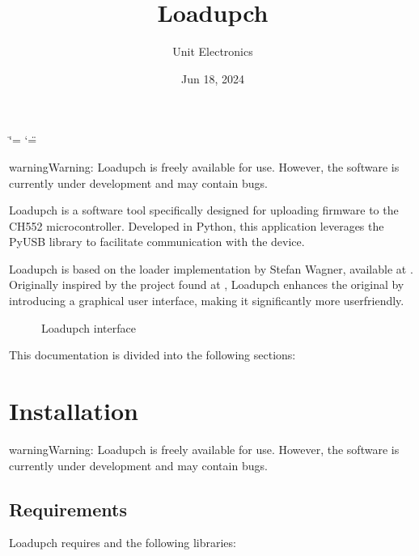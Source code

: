 \documentclass[letterpaper,10pt,english]{sphinxmanual}
\title{Loadupch}
\date{Jun 18, 2024}
\author{Unit Electronics}
\begin{document}
\ifdefined\shorthandoff
  \ifnum\catcode`\=\string=\active\shorthandoff{=}\fi
  \ifnum\catcode`\"=\active{}\fi
\fi

\pagestyle{empty}
\sphinxmaketitle
\pagestyle{plain}
\sphinxtableofcontents
\pagestyle{normal}
\label{\detokenize{index::doc}}


\begin{sphinxadmonition}{warning}{Warning:}
\sphinxAtStartPar
Loadupch is freely available for use. However, the software is currently under development and may contain bugs.
\end{sphinxadmonition}

\sphinxAtStartPar
Loadupch is a software tool specifically designed for uploading firmware to the CH552 microcontroller.
Developed in Python, this application leverages the PyUSB library to facilitate communication with the device.

\sphinxAtStartPar
Loadupch is based on the loader implementation by Stefan Wagner, available at .
Originally inspired by the  project found at ,
Loadupch enhances the original by introducing a graphical user interface, making it significantly more user\sphinxhyphen{}friendly.

\begin{figure}[htbp]
\centering
\capstart

\noindent{}
\caption{Loadupch interface}\label{\detokenize{index:id1}}\end{figure}

\sphinxAtStartPar
This documentation is divided into the following sections:

\sphinxstepscope


\chapter{Installation}
\label{\detokenize{installation:installation}}\label{\detokenize{installation::doc}}
\begin{sphinxadmonition}{warning}{Warning:}
\sphinxAtStartPar
Loadupch is freely available for use. However, the software is currently under development and may contain bugs.
\end{sphinxadmonition}


\section{Requirements}
\label{\detokenize{installation:requirements}}
\sphinxAtStartPar
Loadupch requires   and the following libraries:
\end{document}
